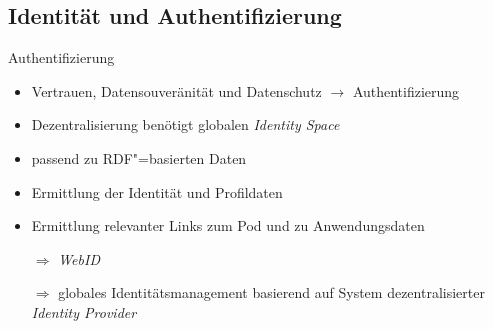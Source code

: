 



\subsection{Identität und Authentifizierung}

\begin{frame}{Authentifizierung \footnotesize\cite{sambraSolidPlatformDecentralized2016}}
    \begin{itemize}
        \item Vertrauen, Datensouveränität und Datenschutz $\to$ Authentifizierung
        \item Dezentralisierung benötigt globalen \emph{Identity Space}
        
        \pause
        \item passend zu RDF"=basierten Daten
        \item Ermittlung der Identität und Profildaten
        \item Ermittlung relevanter Links zum Pod und zu Anwendungsdaten
        
        \pause
        \item[$\Rightarrow$] \emph{WebID} %
        \item[$\Rightarrow$] globales Identitätsmanagement basierend auf System dezentralisierter \emph{Identity Provider}
    \end{itemize}
\end{frame}


